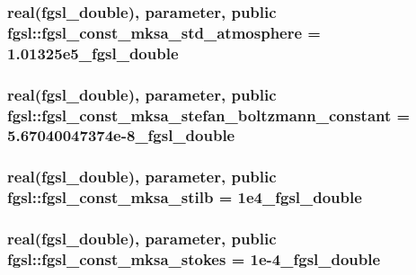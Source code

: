 \hypertarget{classfgsl_ae2440545adbbcd420b11d8e12db0a681}{
\subsubsection[{fgsl\-\_\-const\-\_\-mksa\-\_\-std\-\_\-atmosphere}]{\setlength{\rightskip}{0pt plus 5cm}real({\bf fgsl\-\_\-double}), parameter, public fgsl\-::fgsl\-\_\-const\-\_\-mksa\-\_\-std\-\_\-atmosphere = 1.\-01325e5\-\_\-fgsl\-\_\-double}}\label{classfgsl_ae2440545adbbcd420b11d8e12db0a681}
\hypertarget{classfgsl_a730c5b5646585a81247eaa92703505da}{
\subsubsection[{fgsl\-\_\-const\-\_\-mksa\-\_\-stefan\-\_\-boltzmann\-\_\-constant}]{\setlength{\rightskip}{0pt plus 5cm}real({\bf fgsl\-\_\-double}), parameter, public fgsl\-::fgsl\-\_\-const\-\_\-mksa\-\_\-stefan\-\_\-boltzmann\-\_\-constant = 5.\-67040047374e-\/8\-\_\-fgsl\-\_\-double}}\label{classfgsl_a730c5b5646585a81247eaa92703505da}
\hypertarget{classfgsl_a744ee71f71c6df7add4526f13316e982}{
\subsubsection[{fgsl\-\_\-const\-\_\-mksa\-\_\-stilb}]{\setlength{\rightskip}{0pt plus 5cm}real({\bf fgsl\-\_\-double}), parameter, public fgsl\-::fgsl\-\_\-const\-\_\-mksa\-\_\-stilb = 1e4\-\_\-fgsl\-\_\-double}}\label{classfgsl_a744ee71f71c6df7add4526f13316e982}
\hypertarget{classfgsl_a273648685fb01a8fa87760688d2be8aa}{
\subsubsection[{fgsl\-\_\-const\-\_\-mksa\-\_\-stokes}]{\setlength{\rightskip}{0pt plus 5cm}real({\bf fgsl\-\_\-double}), parameter, public fgsl\-::fgsl\-\_\-const\-\_\-mksa\-\_\-stokes = 1e-\/4\-\_\-fgsl\-\_\-double}}\label{classfgsl_a273648685fb01a8fa87760688d2be8aa}
